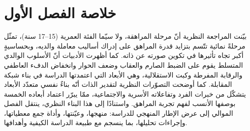 \section*{خلاصة الفصل الأول}
بيّنت المراجعة النظرية أنّ مرحلة المراهقة، ولا سيّما الفئة العمرية (15--17 سنة)، تمثّل مرحلةً نمائية
تتّسم بتزايد قدرة المراهق على إدراك أساليب معاملة والديه، وبحساسيةٍ أكبر تجاه تأثيرها في تكوين صورته
عن ذاته. كما أظهرت الأدبيات أنّ الأسلوب الوالدي المتسلط يقوم على الضبط الصارم والعقاب وضعف
الحوار وانخفاض الدفء العاطفي والرقابة المفرطة وكبت الاستقلالية، وهي الأبعاد التي اعتمدتها الدراسة في
بناء شبكة المقابلة. كما أوضحت التصوّرات النظرية لتقدير الذات أنّه بناءٌ نفسي متعدّد الأبعاد يتشكّل من
خبرات الفرد وتفاعلاته الأسرية والاجتماعية، ممّا يبرّر اعتماد أبعاده الخمسة بوصفها الأنسب لفهم تجربة
المراهق. واستنادًا إلى هذا البناء النظري، ينتقل الفصل الموالي إلى عرض الإطار المنهجي للدراسة: منهجها،
وعيّنتها، وأداة جمع معطياتها، وإجراءات تحليلها، بما ينسجم مع طبيعة الدراسة الكيفية وأهدافها.
